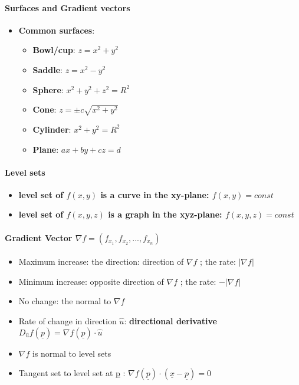 \documentclass[8pt, twocolumn]{article}
\begin{document}
\paragraph{Surfaces and Gradient vectors}
	\begin{itemize}
		\item \textbf{Common surfaces}:
			\begin{itemize}
				\item \textbf{Bowl/cup}: $z = x^2 + y^2$ 
				\item \textbf{Saddle}: $z = x^2 - y^2$ 
				\item \textbf{Sphere}: $x^2 + y^2 + z^2 = R^2$ 
				\item \textbf{Cone}: $z = \pm c\sqrt{x^2 + y^2}$
				\item \textbf{Cylinder}: $x^2 + y^2 = R^2$ 
				\item \textbf{Plane}: $ax + by + cz = d$
			\end{itemize}
	\end{itemize}

\paragraph{Level sets}
			\begin{itemize}
				\item \textbf{level set of $f(x, y)$ is a curve in the xy-plane: $f(x, y) = const$}
				\item \textbf{level set of $f(x, y, z)$ is a graph in the xyz-plane: $f(x, y, z) = const$}
			\end{itemize}



\paragraph{Gradient Vector $\nabla f = (f_{x_1}, f_{x_2}, ..., f_{x_n}) $}
	\begin{itemize}
			\item Maximum increase: the direction: direction of $\nabla f$ ; the rate:  $|\nabla f|$
			\item Minimum increase: opposite direction of $\nabla f$ ; the rate:  $- |\nabla f|$
			\item No change: the normal to $\nabla f$
			\item Rate of change in direction $\hat{u}$: \textbf{directional derivative} $D_{\hat{u}}f(\underline{p}) = \nabla f(\underline{p})  \cdot \hat{u}$
			\item $\nabla f$ is normal to level sets 
			\item Tangent set to level set at \underline{p} : $\nabla f(\underline{p})  \cdot (\underline{x} - \underline{p}) = 0$
	\end{itemize} 
\end{document}

